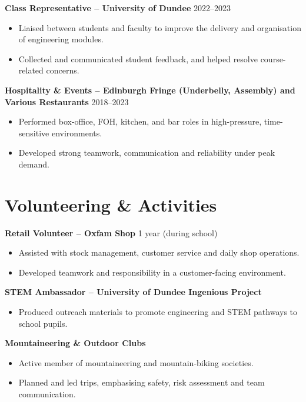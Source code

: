 \documentclass[a4paper,11pt]{article}
\begin{document}
\textbf{Class Representative – University of Dundee} \hfill 2022--2023
\begin{itemize}
    \item Liaised between students and faculty to improve the delivery and organisation of engineering modules.
    \item Collected and communicated student feedback, and helped resolve course-related concerns.
\end{itemize}

\textbf{Hospitality \& Events – Edinburgh Fringe (Underbelly, Assembly) and Various Restaurants} \hfill 2018--2023
\begin{itemize}
    \item Performed box-office, FOH, kitchen, and bar roles in high-pressure, time-sensitive environments.
    \item Developed strong teamwork, communication and reliability under peak demand.
\end{itemize}




\section*{Volunteering \& Activities}

\textbf{Retail Volunteer – Oxfam Shop} \hfill 1 year (during school)
\begin{itemize}
    \item Assisted with stock management, customer service and daily shop operations.
    \item Developed teamwork and responsibility in a customer-facing environment.
\end{itemize}

\textbf{STEM Ambassador – University of Dundee Ingenious Project}
\begin{itemize}
    \item Produced outreach materials to promote engineering and STEM pathways to school pupils.
\end{itemize}

\textbf{Mountaineering \& Outdoor Clubs}
\begin{itemize}
    \item Active member of mountaineering and mountain-biking societies.
    \item Planned and led trips, emphasising safety, risk assessment and team communication.
\end{itemize}
\end{document}
